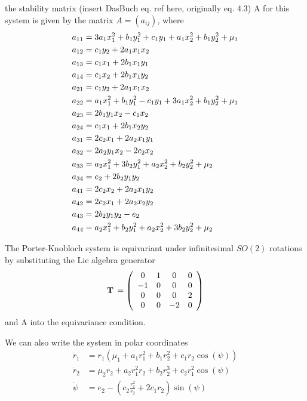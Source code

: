 \documentclass{article}
\begin{document}
the stability matrix ({insert DasBuch eq. ref here, originally eq. 4.3}) A for this 				system is given by the matrix $A=(a_{ij})$, where
\begin{align}
a_{11}&=3 a_1 x_1^2 + b_1 y_1^2 + c_1 y_1 + a_1 x_2^2 + b_1 y_2^2 + \mu_1\\
a_{12}&=c_1 y_2 + 2 a_1 x_1 x_2\\
a_{13}&=c_1 x_1 + 2 b_1 x_1 y_1\\
a_{14}&=c_1 x_2 + 2 b_1 x_1 y_2\\
a_{21}&=c_1 y_2 + 2 a_1 x_1 x_2\\
a_{22}&=a_1 x_1^2 + b_1 y_1^2 - c_1 y_1 + 3 a_1 x_2^2 + b_1 y_2^2 + \mu_1\\
a_{23}&=2 b_1 y_1 x_2 - c_1 x_2\\
a_{24}&=c_1 x_1 + 2 b_1 x_2 y_2\\
a_{31}&=2 c_2 x_1 + 2 a_2 x_1 y_1\\
a_{32}&=2 a_2 y_1 x_2 - 2 c_2 x_2\\
a_{33}&=a_2 x_1^2 + 3 b_2 y_1^2 + a_2 x_2^2 + b_2 y_2^2 + \mu_2\\
a_{34}&=e_2 + 2 b_2 y_1 y_2\\
a_{41}&= 2 c_2 x_2 + 2 a_2 x_1 y_2\\
a_{42}&=2 c_2 x_1 + 2 a_2 x_2 y_2\\
a_{43}&= 2 b_2 y_1 y_2 - e_2\\
a_{44}&=a_2 x_1^2 + b_2 y_1^2 + a_2 x_2^2 + 3 b_2 y_2^2 + \mu_2
\label{{2modeStabMatrix}}
\end{align}

The Porter-Knobloch system is equivariant under infinitesimal $SO(2)$ rotations by substituting the Lie algebra generator
    \begin{equation}
\mathbf{T}  \, =
\left( \begin{array}{cccc}
         0 & 1 & 0 & 0 \\
        -1 & 0 & 0 & 0 \\
         0 & 0 & 0 & 2\\
         0 & 0 & -2 & 0
      \end{array} \right)
\label{{LGTwoMode}}
\end{equation}
and A into the equivariance condition.

We can also write the system in polar coordinates
\begin{align}
\dot{r}_1&=r_1(\mu_1+a_1r_1^2+b_1r_2^2+c_1r_2\cos(\psi))\\
\dot{r}_2&=\mu_2r_2+a_2r_1^2r_2+b_2r_2^3+c_2r_1^2\cos(\psi)\\
\dot{\psi}&=e_2-(c_2\frac{r_1^2}{r_2}+2c_1r_2)\sin(\psi)
\end{align}
\end{document}
